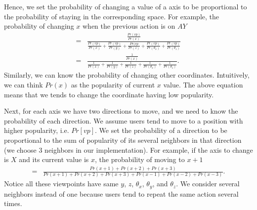 Hence, we set the probability of changing a value of a axis to be proportional to the probability of staying in the
corresponding space. For example, the probability of changing $x$ when the previous action is on $AY$
\begin{align*}
    =&\frac{\frac{Pr(vp)}{Pr(x)}}
            {\frac{Pr(vp)}{Pr(x)}
            +\frac{Pr(vp)}{Pr(y)}
            +\frac{Pr(vp}{Pr(z)}
            +\frac{Pr(vp)}{Pr(\theta_x)}
            +\frac{Pr(vp)}{Pr(\theta_z)}}\\
    =& \frac{\frac{1}{Pr(x)}}
            {\frac{1}{Pr(x)}
            +\frac{1}{Pr(y)}
            +\frac{1}{Pr(z)}
            +\frac{1}{Pr(\theta_x)}
            +\frac{1}{Pr(\theta_z)}
            }.
\end{align*}
Similarly, we can know the probability of changing other coordinates. Intuitively, we can think $Pr(x)$ as 
the popularity of current $x$ value. The above equation means that we tends to change the coordinate having low
popularity.


Next, for each axis we have two directions to move, and we need to know the probability of each direction.
We assume users tend to move to a position with higher popularity, i.e. $Pr[vp]$. We set the probability 
of a direction to be proportional to the sum of popularity of its several neighbors in that direction (we choose
3 neighbors in our implementation). 
For example, if the axis to change is $X$ and its current value is $x$, 
the probability of moving to $x+1$  
\begin{align*}
   =&\frac{Pr(x+1)+Pr(x+2)+Pr(x+3)}
          {Pr(x+1)+Pr(x+2)+Pr(x+3)+Pr(x-1)+Pr(x-2)+Pr(x-3)}.
\end{align*}
Notice all these viewpoints have same $y$, $z$, $\theta_x$, $\theta_y$, and $\theta_z$.
We consider several neighbors instead of one because users tend to repeat 
the same action several times. 

